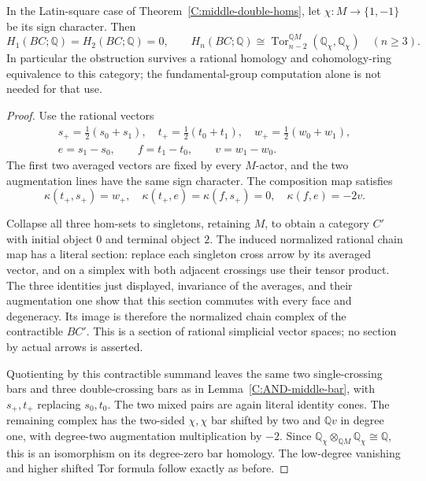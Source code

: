 \begin{lemma}
\label{C:Latin-middle-bar}
In the Latin-square case of Theorem~\ref{C:middle-double-homs},
let $\chi:M\to\{1,-1\}$ be its sign character.  Then
\[
 H_1(BC;\mathbb Q)=H_2(BC;\mathbb Q)=0,
 \qquad
 H_n(BC;\mathbb Q)\cong
 \operatorname{Tor}_{n-2}^{\mathbb QM}
       (\mathbb Q_\chi,\mathbb Q_\chi)
 \quad(n\geq3).
\]
In particular the obstruction survives a rational homology
and cohomology-ring equivalence to this category; the
fundamental-group computation alone is not needed for that use.
\end{lemma}
\begin{proof}
Use the rational vectors
\begin{gather*}
 s_+=\tfrac12(s_0+s_1),\quad
 t_+=\tfrac12(t_0+t_1),\quad
 w_+=\tfrac12(w_0+w_1),\\
 e=s_1-s_0,\qquad f=t_1-t_0,\qquad v=w_1-w_0.
\end{gather*}
The first two averaged vectors are fixed by every $M$-actor,
and the two augmentation lines have the same sign character.
The composition map satisfies
\[
 \kappa(t_+,s_+)=w_+,
 \quad\kappa(t_+,e)=\kappa(f,s_+)=0,
 \quad\kappa(f,e)=-2v.
\]

Collapse all three hom-sets to singletons, retaining $M$,
to obtain a category $C'$ with initial object $0$ and
terminal object $2$.  The induced normalized rational
chain map has a literal section: replace each singleton
cross arrow by its averaged vector, and on a simplex with
both adjacent crossings use their tensor product.  The
three identities just displayed, invariance of the averages,
and their augmentation one show that this section commutes
with every face and degeneracy.  Its image is therefore
the normalized chain complex of the contractible $BC'$.
This is a section of rational simplicial vector spaces;
no section by actual arrows is asserted.

Quotienting by this contractible summand leaves the same
two single-crossing bars and three double-crossing bars as
in Lemma~\ref{C:AND-middle-bar}, with $s_+,t_+$ replacing
$s_0,t_0$.  The two mixed pairs are again literal identity
cones.  The remaining complex has the two-sided
$\chi,\chi$ bar shifted by two and $\mathbb Qv$ in degree
one, with degree-two augmentation multiplication by $-2$.
Since
$\mathbb Q_\chi\otimes_{\mathbb QM}\mathbb Q_\chi\cong\mathbb Q$,
this is an isomorphism on its degree-zero bar homology.
The low-degree vanishing and higher shifted Tor formula
follow exactly as before.
\end{proof}

